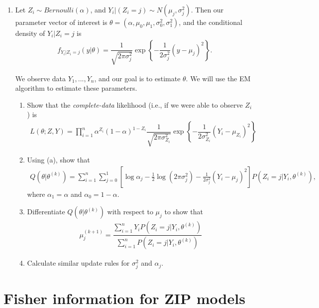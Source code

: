 \documentclass[11pt]{article}
\begin{document}
\begin{enumerate}
\item Let $Z_i \sim Bernoulli(\alpha)$, and $Y_i | (Z_i = j) \sim N(\mu_j, \sigma_j^2)$. Then our parameter vector of interest is $\theta = (\alpha, \mu_0, \mu_1, \sigma_0^2, \sigma_1^2)$, and the conditional density of $Y_i|Z_i = j$ is
\begin{align*}
f_{Y_i|Z_i = j}(y | \theta) = \dfrac{1}{\sqrt{2 \pi \sigma_j^2}} \exp \left\lbrace - \dfrac{1}{2\sigma_j^2} (y - \mu_j)^2 \right\rbrace.
\end{align*}

We observe data $Y_1,...,Y_n$, and our goal is to estimate $\theta$. We will use the EM algorithm to estimate these parameters.

\begin{enumerate}
\item Show that the \textit{complete-data} likelihood (i.e., if we were able to observe $Z_i$) is
\begin{align*}
L(\theta; Z, Y) = \prod \limits_{i=1}^n \alpha^{Z_i}(1 - \alpha)^{1 - Z_i} \dfrac{1}{\sqrt{2 \pi \sigma_{Z_i}^2}} \exp \left\lbrace - \dfrac{1}{2\sigma_{Z_i}^2} (Y_i - \mu_{Z_i})^2 \right\rbrace
\end{align*}

\item Using (a), show that
\begin{align*}
Q(\theta | \theta^{(k)}) = \sum \limits_{i=1}^n \sum \limits_{j=0}^1 [\log \alpha_j - \frac{1}{2} \log(2 \pi \sigma_j^2) - \frac{1}{2 \sigma_j^2}(Y_i - \mu_j)^2]P(Z_i = j | Y_i, \theta^{(k)}),
\end{align*}
where $\alpha_1 = \alpha$ and $\alpha_0 = 1 - \alpha$.

\item Differentiate $Q(\theta | \theta^{(k)})$ with respect to $\mu_j$ to show that 
\begin{align*}
\mu_j^{(k+1)} = \dfrac{\sum \limits_{i=1}^n Y_i P(Z_i = j | Y_i, \theta^{(k)})}{\sum \limits_{i=1}^n P(Z_i = j | Y_i, \theta^{(k)})}
\end{align*}

\item Calculate similar update rules for $\sigma_j^2$ and $\alpha_j$.
\end{enumerate}
\end{enumerate}

\vspace{0.5cm}

\section*{Fisher information for ZIP models}
\end{document}
